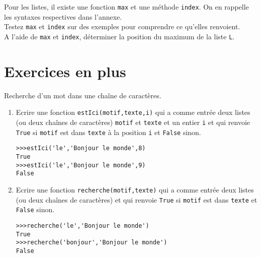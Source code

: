 \begin{exercice}
Pour les listes, il existe une fonction \verb?max? et une méthode \verb?index?. On en rappelle les syntaxes respectives dans l'annexe.\\
Testez \verb?max? et \verb?index? sur des exemples pour comprendre ce qu'elles renvoient.\\
A l'aide de \verb?max? et \verb?index?, déterminer la position du maximum de la liste \verb?L?. 
\end{exercice}





\section{Exercices en plus}

\begin{exercice}
Recherche d'un mot dans une cha\^ ine de caract\` eres.
\begin{enumerate}
\item Ecrire une fonction \verb?estIci(motif,texte,i)? qui a comme entrée deux listes (ou deux cha\^ ines de caract\` eres) \verb?motif? et \verb?texte? et un entier \verb?i? et qui renvoie \verb?True? si \verb?motif? est dans \verb?texte? \` a la position \verb?i? et \verb?False? sinon.
\begin{verbatim}
>>>estIci('le','Bonjour le monde',8)
True
>>>estIci('le','Bonjour le monde',9)
False
\end{verbatim} 
\item Ecrire une fonction \verb?recherche(motif,texte)? qui a comme entrée deux listes (ou deux cha\^ ines de caract\` eres) et qui renvoie \verb?True? si \verb?motif? est dans \verb?texte? et \verb?False? sinon.
\begin{verbatim}
>>>recherche('le','Bonjour le monde')
True
>>>recherche('bonjour','Bonjour le monde')
False
\end{verbatim}
\end{enumerate}
\end{exercice}



